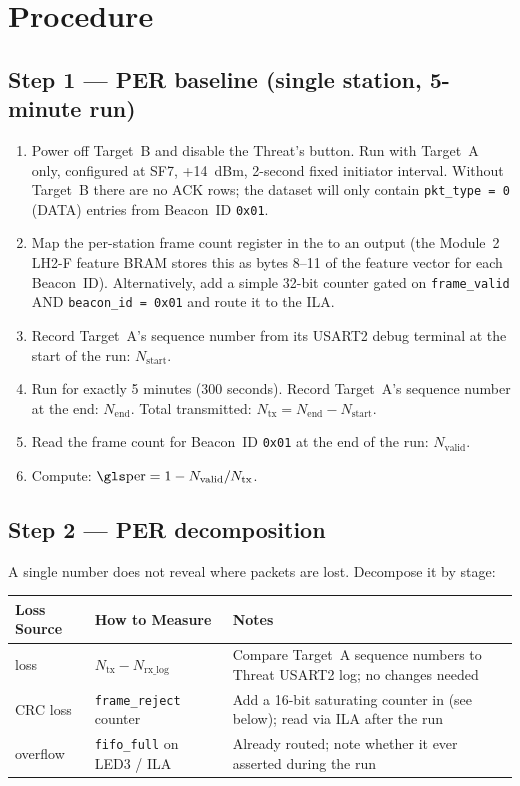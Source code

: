 \documentclass[11pt,letterpaper]{article}
\begin{document}
\section{Procedure}

\subsection{Step 1 --- PER baseline (single station, 5-minute run)}
\begin{enumerate}[leftmargin=2em]
	\item Power off Target~B and disable the Threat's button. Run with Target~A only, configured at SF7, +14~dBm, 2-second fixed initiator interval. Without Target~B there are no ACK rows; the dataset will only contain \texttt{pkt\_type = 0} (DATA) entries from Beacon~ID \texttt{0x01}.
	\item Map the per-station frame count register in the \FPGA{} to an output (the Module~2 LH2-F feature \mbox{BRAM} stores this as bytes 8--11 of the feature vector for each Beacon~\mbox{ID}). Alternatively, add a simple 32-bit counter gated on \texttt{frame\_valid} \mbox{AND} \texttt{beacon\_id = 0x01} and route it to the \mbox{ILA}.
	\item Record Target~A's sequence number from its USART2 debug terminal at the start of the run: $N_{\text{start}}$.
	\item Run for exactly 5 minutes (300 seconds). Record Target~A's sequence number at the end: $N_{\text{end}}$. Total transmitted: $N_{\text{tx}} = N_{\text{end}} - N_{\text{start}}$.
	\item Read the \FPGA{} frame count for Beacon~ID \texttt{0x01} at the end of the run: $N_{\text{valid}}$.
	\item Compute: $\text{\PER{}} = 1 - N_{\text{valid}} / N_{\text{tx}}$.
\end{enumerate}

\subsection{Step 2 --- PER decomposition}
A single \PER{} number does not reveal where packets are lost. Decompose it by stage:

\begin{table}[h!]
	\centering
	\renewcommand{\arraystretch}{1.3}
	\begin{tabularx}{\textwidth}{l l X}
		\toprule
		\textbf{Loss Source} & \textbf{How to Measure} & \textbf{Notes} \\
		\midrule
		\RF{} loss & $N_{\text{tx}} - N_{\text{rx\_log}}$ & Compare Target~A sequence numbers to Threat USART2 log; no \RTL{} changes needed \\
		\mbox{CRC} loss & \texttt{frame\_reject} counter & Add a 16-bit saturating counter in \RTL{} (see below); read via \mbox{ILA} after the run \\
		\FIFO{} overflow & \texttt{fifo\_full} on \mbox{LED3} / \mbox{ILA} & Already routed; note whether it ever asserted during the run \\
		\bottomrule
	\end{tabularx}
\end{table}
\end{document}
